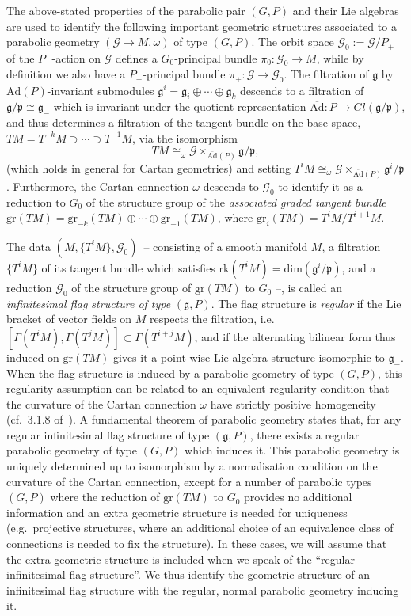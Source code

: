 \documentclass[11pt]{article}
\def\g{\mathfrak{g}}
\def\p{\mathfrak{p}}
\def\Gbdle{\mathcal{G}}
\def\dsum{\oplus}
\def\isom{\cong}
\theoremstyle{plain}
\theoremstyle{definition}
\begin{document}
The above-stated properties of the parabolic pair $(G,P)$ and their Lie algebras are used to identify the following important geometric structures associated to a parabolic geometry $(\Gbdle \rightarrow M,\omega)$ of type $(G,P)$. The orbit space $\Gbdle_0 := \Gbdle/P_+$ of the $P_+$-action on $\Gbdle$ def\/ines a $G_0$-principal bundle $\pi_0: \Gbdle_0 \rightarrow M$, while by def\/inition we also have a $P_+$-principal bundle $\pi_+: \Gbdle \rightarrow \Gbdle_0$. The f\/iltration of $\g$ by $\mathrm{Ad}(P)$-invariant submodules $\g^i = \g_i \dsum \cdots \dsum \g_k$ descends to a f\/iltration of $\g/\p \isom \g_-$ which is invariant under the quotient representation $\overline{\mathrm{Ad}}: P \rightarrow Gl(\g/\p)$, and thus determines a f\/iltration of the tangent bundle on the base space, $TM = T^{-k}M \supset \cdots \supset T^{-1}M$, via the isomorphism
\[
TM \isom_{\omega} \Gbdle \times_{\overline{\mathrm{Ad}}(P)} \g/\p,
\]
(which holds in general for Cartan geometries) and setting $T^iM \isom_{\omega} \Gbdle \times_{\overline{\mathrm{Ad}}(P)} \g^i/\p$. Furthermore, the Cartan connection $\omega$ descends to $\Gbdle_0$ to identify it as a reduction to $G_0$ of the structure group of the \emph{associated graded tangent bundle} $\mathrm{gr}(TM) = \mathrm{gr}_{-k}(TM) \dsum \cdots \dsum \mathrm{gr}_{-1}(TM)$, where $\mathrm{gr}_i(TM) = T^iM/T^{i+1}M$.

The data $(M,\{T^iM\},\Gbdle_0)$~-- consisting of a smooth manifold $M$, a f\/iltration $\{T^iM\}$ of its tangent bundle which satisf\/ies $\mathrm{rk}(T^iM) = \mathrm{dim}(\g^i/\p)$, and a reduction $\Gbdle_0$ of the structure group of $\mathrm{gr}(TM)$ to $G_0$ --, is called an \emph{infinitesimal flag structure of type} $(\g,P)$. The f\/lag structure is \emph{regular} if the Lie bracket of vector f\/ields on $M$ respects the f\/iltration, i.e.\ $[\Gamma(T^iM),\Gamma(T^jM)] \subset \Gamma(T^{i+j}M)$, and if the alternating bilinear form thus induced on $\mathrm{gr}(TM)$ gives it a point-wise Lie algebra structure isomorphic to $\g_-$. When the f\/lag structure is induced by a parabolic geometry of type $(G,P)$, this regularity assumption can be related to an equivalent regularity condition that the curvature of the Cartan connection $\omega$ have strictly positive homogeneity (cf.~3.1.8 of~\cite{CSbook}). A fundamental theorem of parabolic geometry states that, for any regular inf\/initesimal f\/lag structure of type $(\g,P)$, there exists a regular parabolic geometry of type $(G,P)$ which induces it. This parabolic geometry is uniquely determined up to isomorphism by a normalisation condition on the curvature of the Cartan connection, except for a number of parabolic types $(G,P)$ where the reduction of $\mathrm{gr}(TM)$ to $G_0$ provides no additional information and an extra geometric structure is needed for uniqueness (e.g.\ projective structures, where an additional choice of an equivalence class of connections is needed to f\/ix the structure). In these cases, we will assume that the extra geometric structure is included when we speak of the ``regular inf\/initesimal f\/lag structure''. We thus identify the geometric structure of an inf\/initesimal f\/lag structure with the regular, normal parabolic geometry inducing it.
\end{document}
